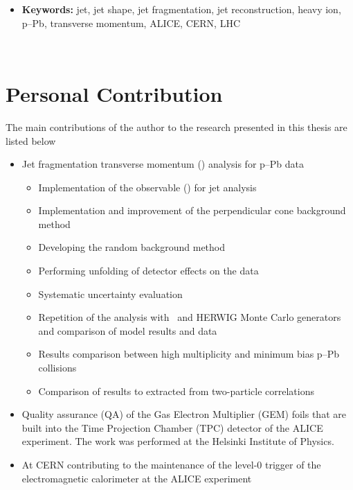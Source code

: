 \begin{itemize}[label={},itemindent=-5.5em,leftmargin=5.5em]

\item {\bf Keywords:} jet, jet shape, jet fragmentation, jet reconstruction, heavy ion, p--Pb, transverse momentum, ALICE, CERN, LHC
\end{itemize}
~\\
\newpage

\section*{Personal Contribution} 


The main contributions of the author to the research presented in this thesis are listed below
\begin{itemize}
\renewcommand\labelitemi{--}

\item Jet fragmentation transverse momentum (\jt{}) analysis for   p--Pb data
\begin{itemize}
\item Implementation of the observable (\jt{}) for jet analysis
\item Implementation and improvement of the perpendicular cone background method
\item Developing the random background method
\item Performing unfolding of detector effects on the data
\item Systematic uncertainty evaluation
\item Repetition of the analysis with \pythia~and HERWIG Monte Carlo generators and comparison of model results and data
\item Results comparison between high multiplicity and minimum bias p--Pb collisions
\item Comparison of results to \jt{} extracted from two-particle correlations
\end{itemize}
\item Quality assurance (QA) of the Gas Electron Multiplier (GEM) foils that are built into the Time Projection Chamber (TPC) detector of the ALICE experiment. The work was performed at the Helsinki Institute of Physics.
\item At CERN contributing to the maintenance of the level-0 trigger of the electromagnetic calorimeter at the ALICE experiment
\end{itemize} 


